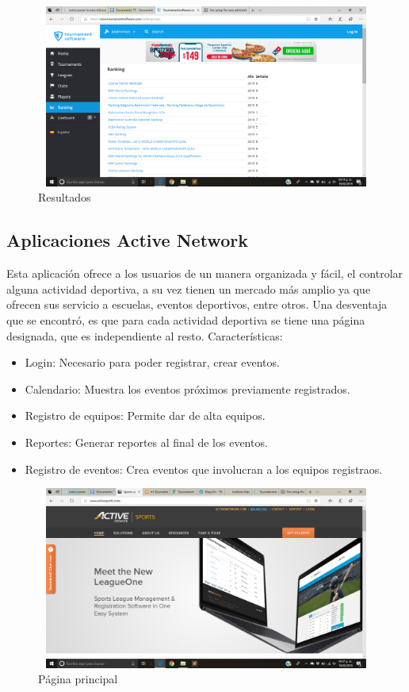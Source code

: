 \pagebreak
\begin{figure}[h]
	\centering
	\includegraphics[width=12cm, height=6cm]{Imagenes/Aplicaciones/Tos3.png}
	\caption{Resultados}
\end{figure}

\subsection{Aplicaciones Active Network}
\noindent Esta aplicación ofrece a los usuarios de un manera organizada y fácil, el controlar alguna actividad deportiva, a su vez tienen un mercado más amplio ya que ofrecen sus servicio a escuelas, eventos deportivos, entre otros. Una desventaja que se encontró, es que para cada actividad deportiva se tiene una página designada, que es independiente al resto. \cite{act}
Características: 
\begin{itemize}
	\item Login: Necesario para poder registrar, crear eventos.
	\item Calendario: Muestra los eventos próximos previamente registrados.
	\item Registro de equipos: Permite dar de alta equipos.
	\item Reportes: Generar reportes al final de los eventos.
	\item Registro de eventos: Crea eventos que involucran a los equipos registraos.
\end{itemize}
\begin{figure}[ht]
	\centering
	\includegraphics[width=12cm, height=6cm]{Imagenes/Aplicaciones/AN1.png}
	\caption{Página principal}
\end{figure}


